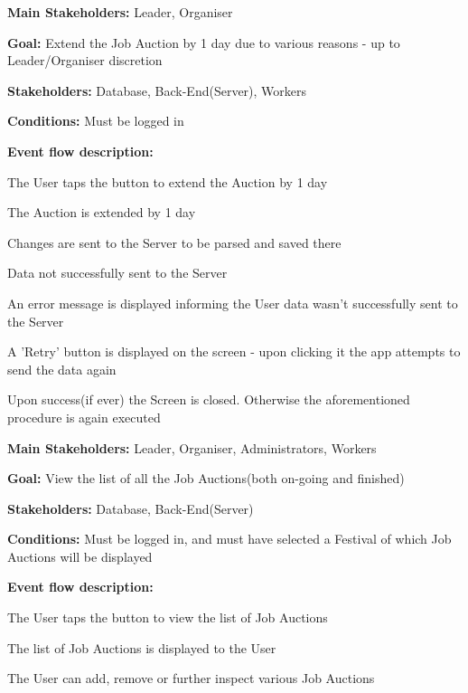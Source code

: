 			\noindent {}
			\begin{packed_item}
				\item \textbf{Main Stakeholders:} Leader, Organiser
				\item \textbf{Goal:} Extend the Job Auction by 1 day due to various reasons - up to Leader/Organiser discretion
				\item \textbf{Stakeholders: } Database, Back-End(Server), Workers
				\item \textbf{Conditions: } Must be logged in
				\item \textbf{Event flow description: }
				\begin{packed_enum}
					\item The User taps the button to extend the Auction by 1 day
					\item The Auction is extended by 1 day
					\item Changes are sent to the Server to be parsed and saved there
				\end{packed_enum}
				
				\begin{packed_item}
					\item[3.a] Data not successfully sent to the Server
					\item[] \begin{packed_enum}
						\item An error message is displayed informing the User data wasn't successfully sent to the Server
						\item A 'Retry' button is displayed on the screen - upon clicking it the app attempts to send the data again
						\item Upon success(if ever) the Screen is closed. Otherwise the aforementioned procedure is again executed
					\end{packed_enum}
				\end{packed_item}
			\end{packed_item}
		
			\noindent \underbar{\textbf{UC41 - View list of Job Auctions}}
			\begin{packed_item}
				\item \textbf{Main Stakeholders:} Leader, Organiser, Administrators, Workers
				\item \textbf{Goal:} View the list of all the Job Auctions(both on-going and finished)
				\item \textbf{Stakeholders: } Database, Back-End(Server)
				\item \textbf{Conditions: } Must be logged in, and must have selected a Festival of which Job Auctions will be displayed
				\item \textbf{Event flow description: }
				\begin{packed_enum}
					\item The User taps the button to view the list of Job Auctions
					\item The list of Job Auctions is displayed to the User
					\item The User can add, remove or further inspect various Job Auctions
				\end{packed_enum}
			\end{packed_item}
			
